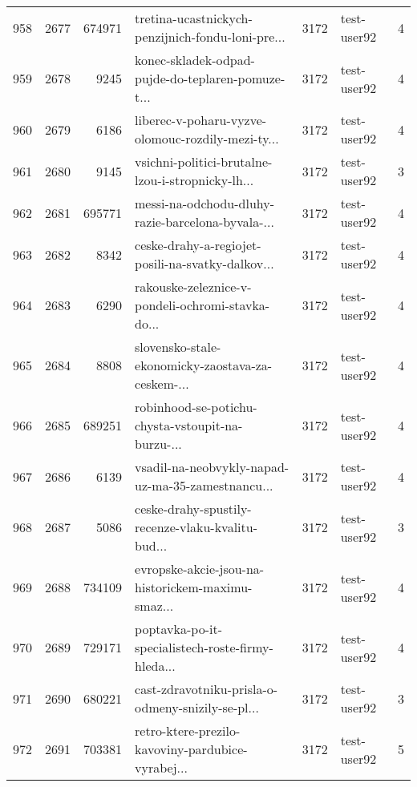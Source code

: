 \begin{tabular}{lrrlrlr}
958  &       2677 &   674971 &  tretina-ucastnickych-penzijnich-fondu-loni-pre... &     3172 &                  test-user92 &               4 \\
959  &       2678 &     9245 &  konec-skladek-odpad-pujde-do-teplaren-pomuze-t... &     3172 &                  test-user92 &               4 \\
960  &       2679 &     6186 &  liberec-v-poharu-vyzve-olomouc-rozdily-mezi-ty... &     3172 &                  test-user92 &               4 \\
961  &       2680 &     9145 &  vsichni-politici-brutalne-lzou-i-stropnicky-lh... &     3172 &                  test-user92 &               3 \\
962  &       2681 &   695771 &  messi-na-odchodu-dluhy-razie-barcelona-byvala-... &     3172 &                  test-user92 &               4 \\
963  &       2682 &     8342 &  ceske-drahy-a-regiojet-posili-na-svatky-dalkov... &     3172 &                  test-user92 &               4 \\
964  &       2683 &     6290 &  rakouske-zeleznice-v-pondeli-ochromi-stavka-do... &     3172 &                  test-user92 &               4 \\
965  &       2684 &     8808 &  slovensko-stale-ekonomicky-zaostava-za-ceskem-... &     3172 &                  test-user92 &               4 \\
966  &       2685 &   689251 &  robinhood-se-potichu-chysta-vstoupit-na-burzu-... &     3172 &                  test-user92 &               4 \\
967  &       2686 &     6139 &  vsadil-na-neobvykly-napad-uz-ma-35-zamestnancu... &     3172 &                  test-user92 &               4 \\
968  &       2687 &     5086 &  ceske-drahy-spustily-recenze-vlaku-kvalitu-bud... &     3172 &                  test-user92 &               3 \\
969  &       2688 &   734109 &  evropske-akcie-jsou-na-historickem-maximu-smaz... &     3172 &                  test-user92 &               4 \\
970  &       2689 &   729171 &  poptavka-po-it-specialistech-roste-firmy-hleda... &     3172 &                  test-user92 &               4 \\
971  &       2690 &   680221 &  cast-zdravotniku-prisla-o-odmeny-snizily-se-pl... &     3172 &                  test-user92 &               3 \\
972  &       2691 &   703381 &  retro-ktere-prezilo-kavoviny-pardubice-vyrabej... &     3172 &                  test-user92 &               5 \\

\end{tabular}
